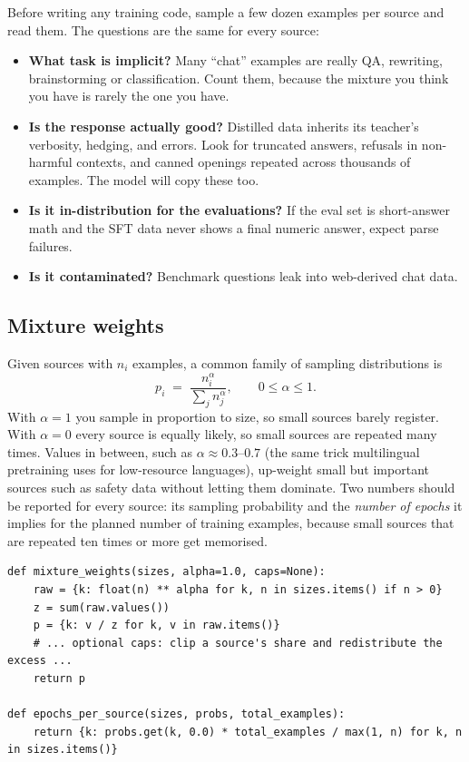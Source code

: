 Before writing any training code, sample a few dozen examples per source and read them. The
questions are the same for every source:
\begin{itemize}
  \item \textbf{What task is implicit?} Many ``chat'' examples are really QA, rewriting,
        brainstorming or classification. Count them, because the mixture you think you have is
        rarely the one you have.
  \item \textbf{Is the response actually good?} Distilled data inherits its teacher's verbosity,
        hedging, and errors. Look for truncated answers, refusals in non-harmful contexts, and
        canned openings repeated across thousands of examples. The model will copy these too.
  \item \textbf{Is it in-distribution for the evaluations?} If the eval set is short-answer math and the
        SFT data never shows a final numeric answer, expect parse failures.
  \item \textbf{Is it contaminated?} Benchmark questions leak into web-derived chat data.
\end{itemize}

\subsection{Mixture weights}

Given sources with $n_i$ examples, a common family of sampling distributions is
\begin{equation}
  p_i \;=\; \frac{n_i^{\alpha}}{\sum_j n_j^{\alpha}}, \qquad 0\le\alpha\le 1 .
  \label{eq:align:mix}
\end{equation}
With $\alpha=1$ you sample in proportion to size, so small sources barely register. With
$\alpha=0$ every source is equally likely, so small sources are repeated many times. Values in
between, such as $\alpha\approx0.3$--$0.7$ (the same trick multilingual pretraining uses for
low-resource languages), up-weight small but important sources such as safety data without
letting them dominate. Two numbers should be reported for every source: its sampling probability
and the \emph{number of epochs} it implies for the planned number of training examples, because
small sources that are repeated ten times or more get memorised.

\begin{lstlisting}[caption={Temperature-style mixture weights with optional per-source caps (\code{llmsys/alignment.py}).},label={lst:align:mix}]
def mixture_weights(sizes, alpha=1.0, caps=None):
    raw = {k: float(n) ** alpha for k, n in sizes.items() if n > 0}
    z = sum(raw.values())
    p = {k: v / z for k, v in raw.items()}
    # ... optional caps: clip a source's share and redistribute the excess ...
    return p

def epochs_per_source(sizes, probs, total_examples):
    return {k: probs.get(k, 0.0) * total_examples / max(1, n) for k, n in sizes.items()}
\end{lstlisting}

